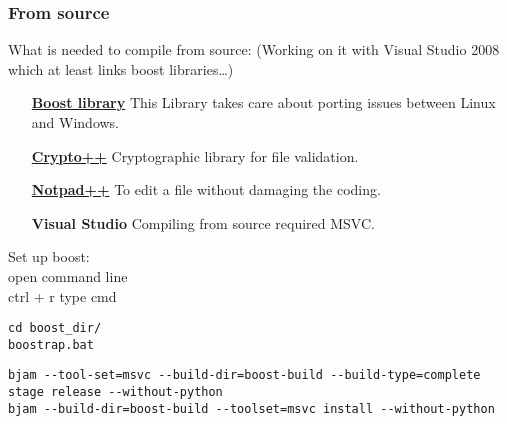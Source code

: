 \subsubsection{From source}
What is needed to compile from source: (Working on it with Visual Studio 2008 which at least links boost libraries\ldots)
\begin{itemize}
\item [ \href{http://sourceforge.net/projects/boost/files/boost/1.44.0/boost_1_44_0.7z/download}{\textbf{Boost library}} ] This Library takes care about porting issues between Linux and Windows.
\item [ \href{http://www.cryptopp.com/}{\textbf{Crypto++}} ] Cryptographic library for file validation.
\item [ \href{http://notepad-plus-plus.org/}{\textbf{Notpad++}} ] To edit a file without damaging the coding.
\item [ \textbf{Visual Studio} ] Compiling from source required MSVC.
\end{itemize}

Set up boost:\\
open command line\\
ctrl + r type cmd
\begin{verbatim} 
cd boost_dir/
boostrap.bat
\end{verbatim}
\begin{verbatim} 
bjam --tool-set=msvc --build-dir=boost-build --build-type=complete stage release --without-python
bjam --build-dir=boost-build --toolset=msvc install --without-python
\end{verbatim}

